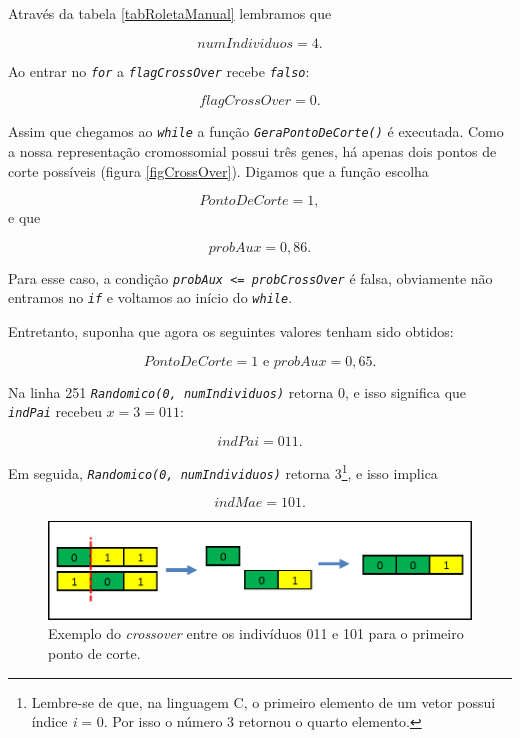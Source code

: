 	Através da tabela \ref{tabRoletaManual} lembramos que 
	
	$$
		numIndividuos = 4.
	$$
	
	Ao entrar no \textit{\texttt{for}} a \textit{\texttt{flagCrossOver}} recebe \textit{\texttt{falso}}:
	
	$$
		flagCrossOver = 0.
	$$

	Assim que chegamos ao \textit{\texttt{while}} a função \textit{\texttt{GeraPontoDeCorte()}} é executada. Como a nossa representação cromossomial possui três genes, há apenas dois pontos de corte possíveis (figura \ref{figCrossOver}). Digamos que a função escolha
	
	$$
		PontoDeCorte = 1,
	$$
	e que
	
	$$
		probAux = 0,86.
	$$
	
	Para esse caso, a condição \textit{\texttt{probAux <= probCrossOver}} é falsa, obviamente não entramos no \textit{\texttt{if}} e voltamos ao início do \textit{\texttt{while}}.
	
	Entretanto, suponha que agora os seguintes valores tenham sido obtidos:
	
	$$
		PontoDeCorte = 1 \mbox{  e  } probAux = 0,65.
	$$
	
	Na linha 251 \textit{\texttt{Randomico(0, numIndividuos)}} retorna 0, e isso significa que \textit{\texttt{indPai}} recebeu $x = 3 = 011$:
	
	$$
		indPai = 011.
	$$
	
	Em seguida, \textit{\texttt{Randomico(0, numIndividuos)}} retorna 3\footnote{Lembre-se de que, na linguagem C, o primeiro elemento de um vetor possui índice \textit{i} = 0. Por isso o número 3 retornou o quarto elemento.}, e isso implica
	
	$$
		indMae = 101.
	$$
	
	\begin{figure}[htp]
		\begin{center}
			\includegraphics[width=13cm]{figs/ga/exemplo_crossover.png}
		\end{center}
		\caption{\label{figExemploCrossOver} Exemplo do \textit{crossover} entre os indivíduos 011 e 101 para o primeiro ponto de corte.}
	\end{figure}
	
